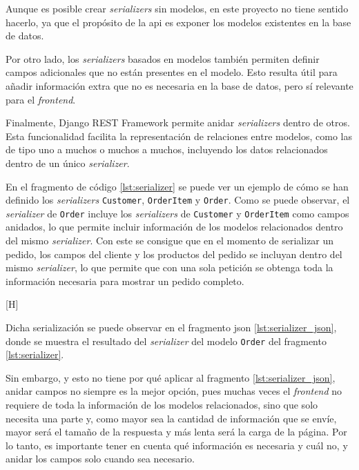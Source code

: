 Aunque es posible crear \textit{serializers} sin modelos, en este proyecto no tiene sentido hacerlo, ya que el propósito de la \gls{api} es exponer los modelos existentes en la base de datos.

Por otro lado, los \textit{serializers} basados en modelos también permiten definir campos adicionales que no están presentes en el modelo. Esto resulta útil para añadir información extra que no es necesaria en la base de datos, pero sí relevante para el \textit{frontend}.

Finalmente, Django REST Framework permite anidar \textit{serializers} dentro de otros. Esta funcionalidad facilita la representación de relaciones entre modelos, como las de tipo uno a muchos o muchos a muchos, incluyendo los datos relacionados dentro de un único \textit{serializer}.

En el fragmento de código \ref{lst:serializer} se puede ver un ejemplo de cómo se han definido los \textit{serializers} \texttt{Customer}, \texttt{OrderItem} y \texttt{Order}. Como se puede observar, el \textit{serializer} de \texttt{Order} incluye los \textit{serializers} de \texttt{Customer} y \texttt{OrderItem} como campos anidados, lo que permite incluir información de los modelos relacionados dentro del mismo \textit{serializer}. Con este se consigue que en el momento de serializar un pedido, los campos del cliente y los productos del pedido se incluyan dentro del mismo \textit{serializer}, lo que permite que con una sola petición se obtenga toda la información necesaria para mostrar un pedido completo.

\begin{center}[H]
    \begin{minipage}{0.8\textwidth}
        
    \end{minipage}
\end{center}

Dicha serialización se puede observar en el fragmento \gls{json} \ref{lst:serializer_json}, donde se muestra el resultado del \textit{serializer} del modelo \texttt{Order} del fragmento \ref{lst:serializer}.

Sin embargo, y esto no tiene por qué aplicar al fragmento \ref{lst:serializer_json}, anidar campos no siempre es la mejor opción, pues muchas veces el \textit{frontend} no requiere de toda la información de los modelos relacionados, sino que solo necesita una parte y, como mayor sea la cantidad de información que se envíe, mayor será el tamaño de la respuesta y más lenta será la carga de la página. Por lo tanto, es importante tener en cuenta qué información es necesaria y cuál no, y anidar los campos solo cuando sea necesario.

